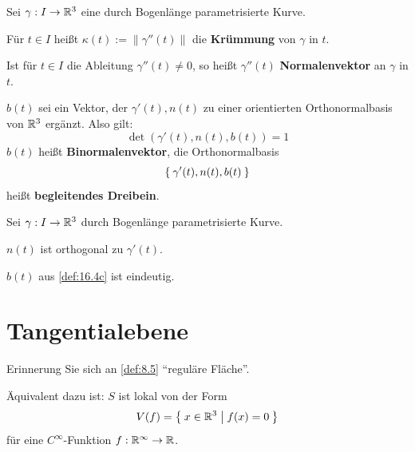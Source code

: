 \begin{definition}%
    Sei $\gamma: I \rightarrow \mathbb{R}^3$ eine durch Bogenlänge parametrisierte
    Kurve.

    \begin{defenum}
        \item Für $t \in I$ heißt $\kappa(t) := \|\gamma''(t)\|$ die
              \textbf{Krümmung} von $\gamma$ in $t$.
        \item Ist für $t \in I$ die Ableitung $\gamma''(t) \neq 0$,
              so heißt $\gamma''(t)$ \textbf{Normalenvektor}
              an $\gamma$ in $t$.
        \item \label{def:16.4c} $b(t)$ sei ein Vektor, der $\gamma'(t), n(t)$
              zu einer orientierten Orthonormalbasis von $\mathbb{R}^3$ ergänzt.
              Also gilt:
              \[\det(\gamma'(t), n(t), b(t)) = 1\]
              $b(t)$ heißt \textbf{Binormalenvektor},
              die Orthonormalbasis 
              \[\Set{\gamma'(t), n(t), b(t)}\]
              heißt \textbf{begleitendes Dreibein}.
    \end{defenum}
\end{definition}

\begin{bemerkung}%
    Sei $\gamma: I \rightarrow \mathbb{R}^3$ durch Bogenlänge parametrisierte
    Kurve.

    \begin{bemenum}
        \item $n(t)$ ist orthogonal zu $\gamma'(t)$.
        \item $b(t)$ aus \cref{def:16.4c} ist eindeutig.
    \end{bemenum}
\end{bemerkung}

\section{Tangentialebene}
Erinnerung Sie sich an \cref{def:8.5} \enquote{reguläre Fläche}.

Äquivalent dazu ist: $S$ ist lokal von der Form
\[V(f) = \Set{x \in \ensuremath{\mathbb{R}}^3 | f(x) = 0 }\]
für eine $C^\infty$-Funktion $f: \mathbb{R}^\infty \rightarrow \mathbb{R}$.

